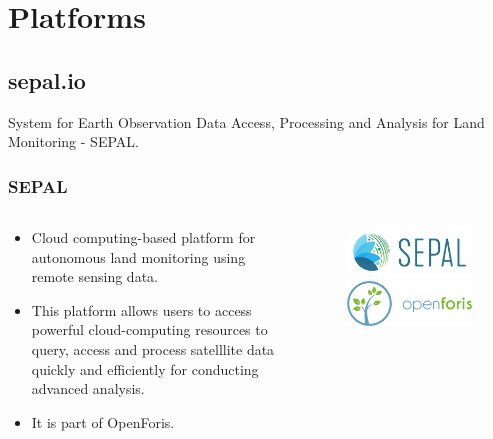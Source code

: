 \documentclass[aspectratio=169]{beamer}
\begin{document}
\section{Platforms}



\subsection{sepal.io}

\begin{frame}
    System for Earth Observation Data Access, Processing and Analysis for Land
    Monitoring - SEPAL.
\end{frame}

\begin{frame}
    \frametitle{SEPAL}
    \begin{columns}
        \begin{column}{0.5\textwidth}
            \begin{itemize}
                \item Cloud computing-based platform for autonomous land 
                    monitoring using remote sensing data.
                \item This platform allows users to access powerful 
                    cloud-computing resources to query, access and process 
                    satelllite data quickly and efficiently for conducting 
                    advanced analysis.
                \item It is part of OpenForis.
            \end{itemize}
        \end{column}
        \begin{column}{0.5\textwidth}
            \begin{figure}
                \centering
                \includegraphics[scale=0.4]{logos/sepal.png}
                \includegraphics[scale=0.8]{logos/openforis.png}
            \end{figure}
        \end{column}
    \end{columns}
\end{frame}
\end{document}
